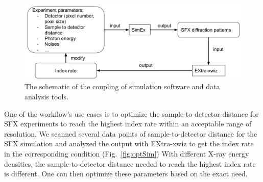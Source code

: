 \documentclass[11pt, a4paper]{article}
\begin{document}
\begin{figure}[h!!!]
    \centering
    \includegraphics[width=0.75\columnwidth]{figures/feedbackloop.png}
    \caption{The schematic of the coupling of simulation software and data analysis tools.}
    \label{fig:feedbackloop}
\end{figure}
One of the workflow's use cases is to optimize the sample-to-detector distance for SFX experiments to reach the highest index rate within an acceptable range of resolution. We scanned several data points of sample-to-detector distance for the SFX simulation and analyzed the output with EXtra-xwiz to get the index rate in the corresponding condition (Fig.~\ref{fig:optSim}) With different X-ray energy densities, the sample-to-detector distance needed to reach the highest index rate is different. One can then optimize these parameters based on the exact need.
\end{document}
